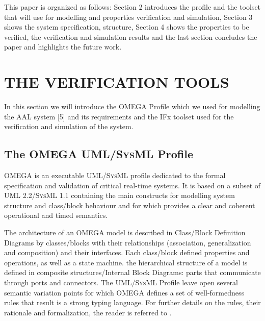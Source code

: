 \documentclass[a4paper,twoside]{article}
\def\sysml{\textsc{SysML}}
\def\uml{\textsc{UML}}
\begin{document}

This paper is organized as follows: Section 2 introduces the profile and the toolset that will use for modelling and properties verification and simulation,  Section 3 shows the system specification, structure, Section 4 shows the properties to be verified, the verification and simulation results and the last section concludes the paper and highlights the future work.


\section{\uppercase{The verification tools}}
\label{verification tools}


\noindent In this section we will introduce the OMEGA Profile which we used for modelling the AAL system [5] and its requirements and the IFx toolset used for the verification and simulation of the system. 

\subsection{The OMEGA \uml{}/\sysml{} Profile}

OMEGA is an executable \uml{}/\sysml{} profile dedicated to the formal specification and validation of critical real-time systems. It is based on a subset of \uml{} 2.2/\sysml{} 1.1 containing the main constructs for modelling system structure and class/block behaviour and for which provides a clear and coherent operational and timed semantics.


The architecture of an OMEGA model is described in Class/Block Definition Diagrams by classes/blocks with their relationships (association, generalization and composition) and their interfaces. Each class/block defined properties and operations, as well as a state machine. the hierarchical structure of a model is defined in composite structures/Internal Block Diagrams: parts that communicate through ports and connectors. The \uml{}/\sysml{} Profile leave open several semantic variation points for which OMEGA defines a set of well-formedness rules that result is a strong typing language. For further details on the rules, their rationale and formalization, the reader is referred to \cite{OberD11}.
\end{document}

